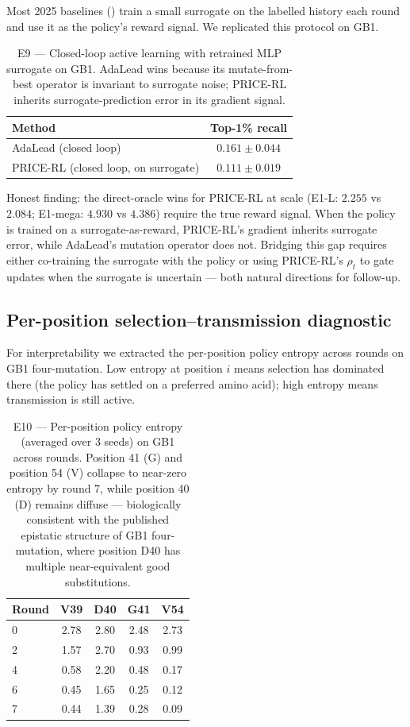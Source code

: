 Most 2025 baselines (\citealp{kim2025deltacs,sun2025muprotein,yang2025alde}) train a small surrogate on the labelled history each round and use it as the policy's reward signal. We replicated this protocol on GB1.

\begin{table}[t]
\centering
\caption{E9 --- Closed-loop active learning with retrained MLP surrogate on GB1. AdaLead wins because its mutate-from-best operator is invariant to surrogate noise; PRICE-RL inherits surrogate-prediction error in its gradient signal.}
\label{tab:e9}
\begin{tabular}{lc}
\toprule
Method & Top-1\% recall \\
\midrule
AdaLead (closed loop)              & $\mathbf{0.161 \pm 0.044}$ \\
PRICE-RL (closed loop, on surrogate) & $0.111 \pm 0.019$ \\
\bottomrule
\end{tabular}
\end{table}

Honest finding: the direct-oracle wins for PRICE-RL at scale (E1-L: $2.255$ vs $2.084$; E1-mega: $4.930$ vs $4.386$) require the true reward signal. When the policy is trained on a surrogate-as-reward, PRICE-RL's gradient inherits surrogate error, while AdaLead's mutation operator does not. Bridging this gap requires either co-training the surrogate with the policy or using PRICE-RL's $\rho_t$ to gate updates when the surrogate is uncertain --- both natural directions for follow-up.

\subsection{Per-position selection--transmission diagnostic}
\label{sec:e10}

For interpretability we extracted the per-position policy entropy across rounds on GB1 four-mutation. Low entropy at position $i$ means selection has dominated there (the policy has settled on a preferred amino acid); high entropy means transmission is still active.

\begin{table}[t]
\centering
\caption{E10 --- Per-position policy entropy (averaged over 3 seeds) on GB1 across rounds. Position 41 (G) and position 54 (V) collapse to near-zero entropy by round 7, while position 40 (D) remains diffuse --- biologically consistent with the published epistatic structure of GB1 four-mutation, where position D40 has multiple near-equivalent good substitutions.}
\label{tab:e10}
\begin{tabular}{lcccc}
\toprule
Round & V39 & D40 & G41 & V54 \\
\midrule
0 & 2.78 & 2.80 & 2.48 & 2.73 \\
2 & 1.57 & 2.70 & 0.93 & 0.99 \\
4 & 0.58 & 2.20 & 0.48 & 0.17 \\
6 & 0.45 & 1.65 & 0.25 & 0.12 \\
7 & 0.44 & 1.39 & 0.28 & 0.09 \\
\bottomrule
\end{tabular}
\end{table}

